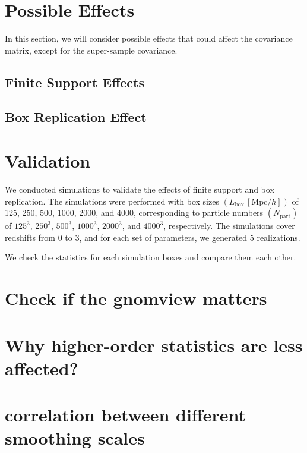 \section{Possible Effects}
In this section, we will consider possible effects that could affect the covariance matrix, except for the super-sample covariance.
\subsection{Finite Support Effects}

\subsection{Box Replication Effect}

\section{Validation}
We conducted simulations to validate the effects of finite support and box replication. The simulations were performed with box sizes $(L_{\text{box}}\, [\mathrm{Mpc}/h])$ of 125, 250, 500, 1000, 2000, and 4000, corresponding to particle numbers $(N_{\text{part}})$ of $125^3$, $250^3$, $500^3$, $1000^3$, $2000^3$, and $4000^3$, respectively. The simulations cover redshifts from $0$ to $3$, and for each set of parameters, we generated 5 realizations.

We check the statistics for each simulation boxes and compare them each other.



\section{Check if the gnomview matters}

\section{Why higher-order statistics are less affected?}

\section{correlation between different smoothing scales}




